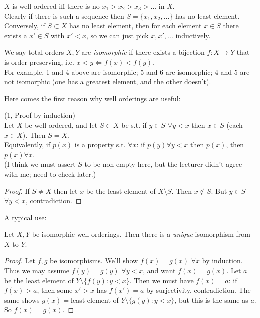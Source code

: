 \documentclass[a4paper]{article}
\begin{document}
\begin{rem}
$X$ is well-ordered iff there is no $x_1>x_2>x_3>...$ in $X$.\\
Clearly if there is such a sequence then $S=\{x_1,x_2,...\}$ has no least element. Conversely, if $S \subset X$ has no least element, then for each element $x \in S$ there exists a $x' \in S$ with $x' < x$, so we can just pick $x,x',...$ inductively.
\end{rem}

\begin{defi}
We say total orders $X,Y$ are \emph{isomorphic} if there exists a bijection $f:X \to Y$ that is order-preserving, i.e. $x<y \iff f(x) <f(y)$.\\
For example, 1 and 4 above are isomorphic; 5 and 6 are isomorphic; 4 and 5 are not isomorphic (one has a greatest element, and the other doesn't).
\end{defi}

Here comes the first reason why well orderings are useful:
\begin{prop} (1, Proof by induction)\\
Let $X$ be well-ordered, and let $S \subset X$ be s.t. if $y \in S$ $\forall y < x$ then $x \in S$ (each $x \in X$). Then $S=X$.\\
Equivalently, if $p(x)$ is a property s.t. $\forall x$: if $p(y) \forall y < x$ then $p(x)$, then $p(x) \forall x$.\\
(I think we must assert $S$ to be non-empty here, but the lecturer didn't agree with me; need to check later.)
\begin{proof}
If $S \neq X$ then let $x$ be the least element of $X \setminus S$. Then $x \not\in S$. But $y \in S$ $\forall y<x$, contradiction.
\end{proof}
\end{prop}

A typical use:

\begin{prop}
Let $X,Y$ be isomorphic well-orderings. Then there is a \emph{unique} isomorphism from $X$ to $Y$.
\begin{proof}
Let $f,g$ be isomorphisms. We'll show $f(x) = g(x)$ $\forall x$ by induction. Thus we may assume $f(y) = g(y)$ $\forall y < x$, and want $f(x) = g(x)$. Let $a$ be the least element of $Y\setminus \{f(y):y<x\}$. Then we must have $f(x) = a$: if $f(x) > a$, then some $x'>x$ has $f(x') = a$ by surjectivity, contradiction. The same shows $g(x) = $least element of $Y\setminus \{g(y):y<x\}$, but this is the same as $a$. So $f(x) = g(x)$.
\end{proof}
\end{prop}
\end{document}
